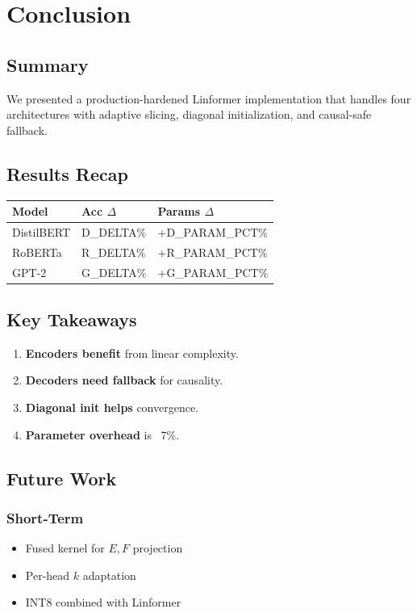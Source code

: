 \section{Conclusion}

\subsection{Summary}

We presented a production-hardened Linformer implementation that handles 
four architectures with adaptive slicing, diagonal initialization, and 
causal-safe fallback.

\subsection{Results Recap}

\begin{table}[H]
\centering
\small
\begin{tabular}{lll}
\toprule
\textbf{Model} & \textbf{Acc $\Delta$} & \textbf{Params $\Delta$} \\
\midrule
DistilBERT & {{D\_DELTA}}\% & +{{D\_PARAM\_PCT}}\% \\
RoBERTa & {{R\_DELTA}}\% & +{{R\_PARAM\_PCT}}\% \\
GPT-2 & {{G\_DELTA}}\% & +{{G\_PARAM\_PCT}}\% \\
\bottomrule
\end{tabular}
\end{table}

\subsection{Key Takeaways}

\begin{enumerate}
\item \textbf{Encoders benefit} from linear complexity.
\item \textbf{Decoders need fallback} for causality.
\item \textbf{Diagonal init helps} convergence.
\item \textbf{Parameter overhead} is ~7\%.

\end{enumerate}
\subsection{Future Work}

\subsubsection{Short-Term}
\begin{itemize}
\item Fused kernel for $E, F$ projection
\item Per-head $k$ adaptation
\item INT8 combined with Linformer

\end{itemize}
